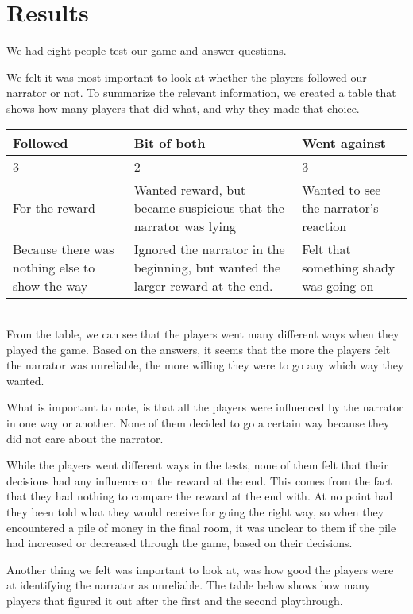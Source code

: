 \section{Results}
\label{Results}

We had eight people test our game and answer questions.

We felt it was most important to look at whether the players followed our narrator or not. To summarize the relevant information, we created a table that shows how many players that did what, and why they made that choice. \\

\begin{tabular}{ | p{2.3cm} | p{2.3cm} | p{2.3cm} | }
  \hline                       
  \textbf{Followed} & \textbf{Bit of both} & \textbf{Went against} \\
  \hline  
  3 & 2 & 3 \\
  \hline  
  For the reward & Wanted reward, but became suspicious that the narrator was lying & Wanted to see the narrator’s reaction \\
  \hline  
  Because there was nothing else to show the way & Ignored the narrator in the beginning, but wanted the larger reward at the end. & Felt that something shady was going on \\
  \hline  
\end{tabular} \\

From the table, we can see that the players went many different ways when they played the game. Based on the answers, it seems that the more the players felt the narrator was unreliable, the more willing they were to go any which way they wanted.

What is important to note, is that all the players were influenced by the narrator in one way or another. None of them decided to go a certain way because they did not care about the narrator. 

While the players went different ways in the tests, none of them felt that their decisions had any influence on the reward at the end. This comes from the fact that they had nothing to compare the reward at the end with. At no point had they been told what they would receive for going the right way, so when they encountered a pile of money in the final room, it was unclear to them if the pile had increased or decreased through the game, based on their decisions. 

Another thing we felt was important to look at, was how good the players were at identifying the narrator as unreliable. The table below shows how many players that figured it out after the first and the second playthrough. \\

